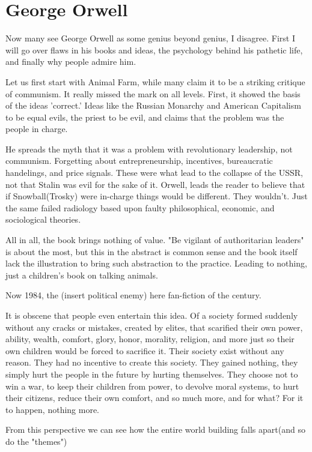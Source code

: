 \section{George Orwell}
\par Now many see George Orwell as some genius beyond genius, I disagree. First I will go over flaws in his books and ideas, the psychology behind his pathetic life, and finally why people admire him.
\par Let us first start with Animal Farm, while many claim it to be a striking critique of communism. It really missed the mark on all levels. First, it showed the basis of the ideas 'correct.' Ideas like the Russian Monarchy and American Capitalism to be equal evils, the priest to be evil, and claims that the problem was the people in charge.
\par He spreads the myth that it was a problem with revolutionary leadership, not communism. Forgetting about entrepreneurship, incentives, bureaucratic handelings, and price signals. These were what lead to the collapse of the USSR, not that Stalin was evil for the sake of it. Orwell, leads the reader to believe that if Snowball(Trosky) were in-charge things would be different. They wouldn't. Just the same failed radiology based upon faulty philosophical, economic, and sociological theories.
\par All in all, the book brings nothing of value. "Be vigilant of authoritarian leaders" is about the most, but this in the abstract is common sense and the book itself lack the illustration to bring such abstraction to the practice. Leading to nothing, just a children's book on talking animals.
\par Now 1984, the (insert political enemy) here fan-fiction of the century.
\par It is obscene that people even entertain this idea. Of a society formed suddenly without any cracks or mistakes, created by elites, that scarified their own power, ability, wealth, comfort, glory, honor, morality, religion, and more just so their own children would be forced to sacrifice it. Their society exist without any reason. They had no incentive to create this society. They gained nothing, they simply hurt the people in the future by hurting themselves. They choose not to win a war, to keep their children from power, to devolve moral systems, to hurt their citizens, reduce their own comfort, and so much more, and for what? For it to happen, nothing more.
\par From this perspective we can see how the entire world building falls apart(and so do the "themes")
